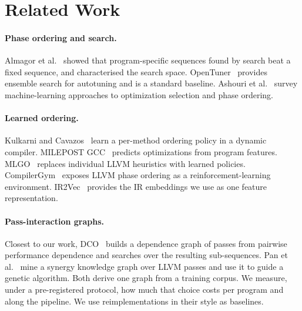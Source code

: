 \section{Related Work}
\label{sec:related}

\paragraph{Phase ordering and search.}
Almagor et al.~\cite{almagor2004} showed that program-specific sequences found by search beat a
fixed sequence, and characterised the search space. OpenTuner~\cite{opentuner} provides ensemble
search for autotuning and is a standard baseline. Ashouri et al.~\cite{ashouri2018survey} survey
machine-learning approaches to optimization selection and phase ordering.

\paragraph{Learned ordering.}
Kulkarni and Cavazos~\cite{kulkarni2012} learn a per-method ordering policy in a dynamic compiler.
MILEPOST GCC~\cite{milepost} predicts optimizations from program features. MLGO~\cite{mlgo}
replaces individual LLVM heuristics with learned policies. CompilerGym~\cite{compilergym} exposes
LLVM phase ordering as a reinforcement-learning environment. IR2Vec~\cite{ir2vec} provides the IR
embeddings we use as one feature representation.

\paragraph{Pass-interaction graphs.}
Closest to our work, DCO~\cite{dco2024} builds a dependence graph of passes from pairwise
performance dependence and searches over the resulting sub-sequences. Pan et
al.~\cite{pan2025synergy} mine a synergy knowledge graph over LLVM passes and use it to guide a
genetic algorithm. Both derive one graph from a training corpus. We measure, under a
pre-registered protocol, how much that choice costs per program and along the pipeline. We use
reimplementations in their style as baselines.

